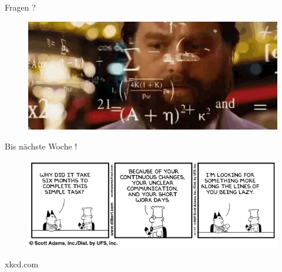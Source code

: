 \documentclass[18pt]{beamer}
\begin{document}
\begin{frame}{Fragen ?}
    \begin{figure}
        \includegraphics[scale=.7]{img/formulas.png}
    \end{figure}
\end{frame}

\begin{frame}{Bis nächste Woche !}
    \begin{figure}
        \includegraphics[scale=.5]{img/dilbert2733310071001kc4.png}
    \end{figure}

    \begin{flushright}
    \footnotesize{xkcd.com}
    \end{flushright}
\end{frame}

\backupend
\end{document}
